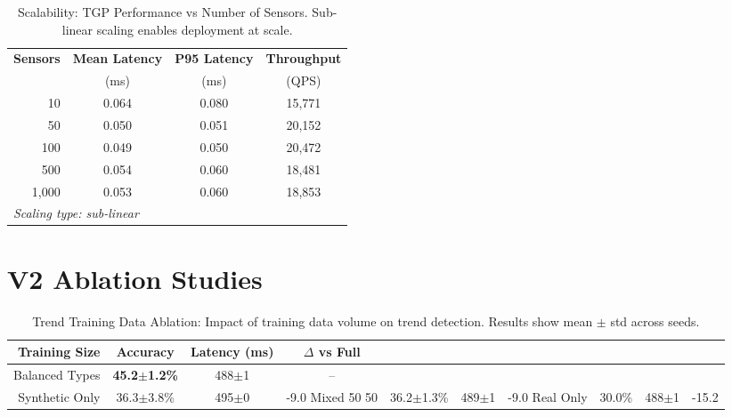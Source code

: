 \documentclass[letterpaper]{article}
\begin{document}
\begin{table}[t]
\centering
\caption{Scalability: TGP Performance vs Number of Sensors.
Sub-linear scaling enables deployment at scale.}
\label{tab:scalability}
\begin{tabular}{r c c c}
\toprule
\textbf{Sensors} & \textbf{Mean Latency} & \textbf{P95 Latency} & \textbf{Throughput} \\
 & (ms) & (ms) & (QPS) \\
\midrule
10 & 0.064 & 0.080 & 15,771 \\
50 & 0.050 & 0.051 & 20,152 \\
100 & 0.049 & 0.050 & 20,472 \\
500 & 0.054 & 0.060 & 18,481 \\
1,000 & 0.053 & 0.060 & 18,853 \\
\midrule
\multicolumn{4}{l}{\textit{Scaling type: sub-linear}} \\

\bottomrule
\end{tabular}
\end{table}

\clearpage

\section*{V2 Ablation Studies}


\begin{table}[t]
\centering
\caption{Trend Training Data Ablation: Impact of training data volume on trend detection.
Results show mean $\pm$ std across seeds.}
\label{tab:trend_ablation}
\begin{tabular}{r c c c}
\toprule
\textbf{Training Size} & \textbf{Accuracy} & \textbf{Latency (ms)} & \textbf{$\Delta$ vs Full} \\
\midrule
Balanced Types & \textbf{45.2$\pm$1.2\%} & 488$\pm$1 & -- \\
Synthetic Only & 36.3$\pm$3.8\% & 495$\pm$0 & -9.0%
Mixed 50 50 & 36.2$\pm$1.3\% & 489$\pm$1 & -9.0%
Real Only & 30.0\% & 488$\pm$1 & -15.2%

\bottomrule
\end{tabular}
\end{table}
\end{document}
